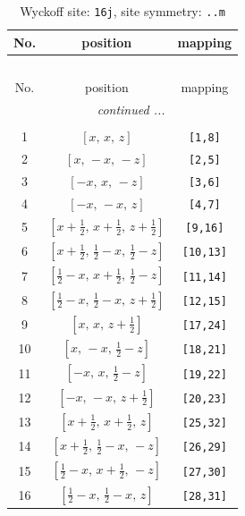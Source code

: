 \documentclass[fleqn,8pt]{jsarticle}
\begin{document}
\renewcommand{\arraystretch}{1.2}
\begin{longtable}{ccc}
\caption{Wyckoff site: {\tt 16j}, site symmetry: {\tt ..m}}
 \\
 \hline \hline
No. & position & mapping \\ \hline \endfirsthead

\multicolumn{2}{l}{\tablename\ \thetable{}} \\
 \hline \hline
No. & position & mapping \\ \hline \endhead

 \hline \hline
\multicolumn{2}{r}{\footnotesize\it continued ...} \\ \endfoot

 \hline \hline
\multicolumn{2}{r}{} \\ \endlastfoot

1 & $\left[ x,\, x,\, z \right]$ & {\tt [1,8]} \\ \hline
2 & $\left[ x,\, - x,\, - z \right]$ & {\tt [2,5]} \\ \hline
3 & $\left[ - x,\, x,\, - z \right]$ & {\tt [3,6]} \\ \hline
4 & $\left[ - x,\, - x,\, z \right]$ & {\tt [4,7]} \\ \hline
5 & $\left[ x + \frac{1}{2},\, x + \frac{1}{2},\, z + \frac{1}{2} \right]$ & {\tt [9,16]} \\ \hline
6 & $\left[ x + \frac{1}{2},\, \frac{1}{2} - x,\, \frac{1}{2} - z \right]$ & {\tt [10,13]} \\ \hline
7 & $\left[ \frac{1}{2} - x,\, x + \frac{1}{2},\, \frac{1}{2} - z \right]$ & {\tt [11,14]} \\ \hline
8 & $\left[ \frac{1}{2} - x,\, \frac{1}{2} - x,\, z + \frac{1}{2} \right]$ & {\tt [12,15]} \\ \hline
9 & $\left[ x,\, x,\, z + \frac{1}{2} \right]$ & {\tt [17,24]} \\ \hline
10 & $\left[ x,\, - x,\, \frac{1}{2} - z \right]$ & {\tt [18,21]} \\ \hline
11 & $\left[ - x,\, x,\, \frac{1}{2} - z \right]$ & {\tt [19,22]} \\ \hline
12 & $\left[ - x,\, - x,\, z + \frac{1}{2} \right]$ & {\tt [20,23]} \\ \hline
13 & $\left[ x + \frac{1}{2},\, x + \frac{1}{2},\, z \right]$ & {\tt [25,32]} \\ \hline
14 & $\left[ x + \frac{1}{2},\, \frac{1}{2} - x,\, - z \right]$ & {\tt [26,29]} \\ \hline
15 & $\left[ \frac{1}{2} - x,\, x + \frac{1}{2},\, - z \right]$ & {\tt [27,30]} \\ \hline
16 & $\left[ \frac{1}{2} - x,\, \frac{1}{2} - x,\, z \right]$ & {\tt [28,31]} \\
\end{longtable}
\end{document}
